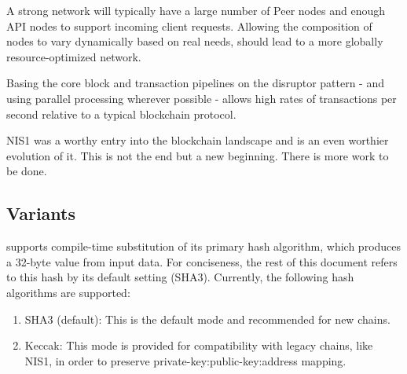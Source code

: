 A strong network will typically have a large number of Peer nodes and enough API nodes to support incoming client requests.
Allowing the composition of nodes to vary dynamically based on real needs, should lead to a more globally resource-optimized network.

Basing the core block and transaction pipelines on the disruptor pattern - and using parallel processing wherever possible - allows high rates of transactions per second relative to a typical blockchain protocol.

NIS1 was a worthy entry into the blockchain landscape and \codenamespace is an even worthier evolution of it.
This is not the end but a new beginning.
There is more work to be done.

\subsection{Variants}

\codenamespace supports compile-time substitution of its primary hash algorithm, which produces a 32-byte value from input data.
For conciseness, the rest of this document refers to this hash by its default setting (SHA3).
Currently, the following hash algorithms are supported:

\begin{enumerate}
	\item{SHA3 (default): This is the default mode and recommended for new chains.}
	\item{Keccak: This mode is provided for compatibility with legacy chains, like NIS1, in order to preserve private-key:public-key:address mapping.}
\end{enumerate}
